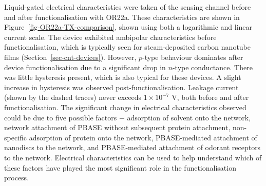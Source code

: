 \documentclass[
  a4paper,
]{scrbook}
\begin{document}
Liquid-gated electrical characteristics were taken of the sensing
channel before and after functionalisation with OR22a. These
characteristics are shown in Figure~\ref{fig-OR22a-TX-comparison}, shown
using both a logarithmic and linear current scale. The device exhibited
ambipolar characteristics before functionalisation, which is typically
seen for steam-deposited carbon nanotube films
(Section~\ref{sec-cnt-devices}). However, \(p\)-type behaviour dominates
after device functionalisation due to a significant drop in \(n\)-type
conductance. There was little hysteresis present, which is also typical
for these devices. A slight increase in hysteresis was observed
post-functionalisation. Leakage current (shown by the dashed traces)
never exceeds \(1 \times 10^{-7}\) V, both before and after
functionalisation. The significant change in electrical characteristics
observed could be due to five possible factors \(-\) adsorption of
solvent onto the network, network attachment of PBASE without subsequent
protein attachment, non-specific adsorption of protein onto the network,
PBASE-mediated attachment of nanodiscs to the network, and
PBASE-mediated attachment of odorant receptors to the network.
Electrical characteristics can be used to help understand which of these
factors have played the most significant role in the functionalisation
process.
\end{document}
